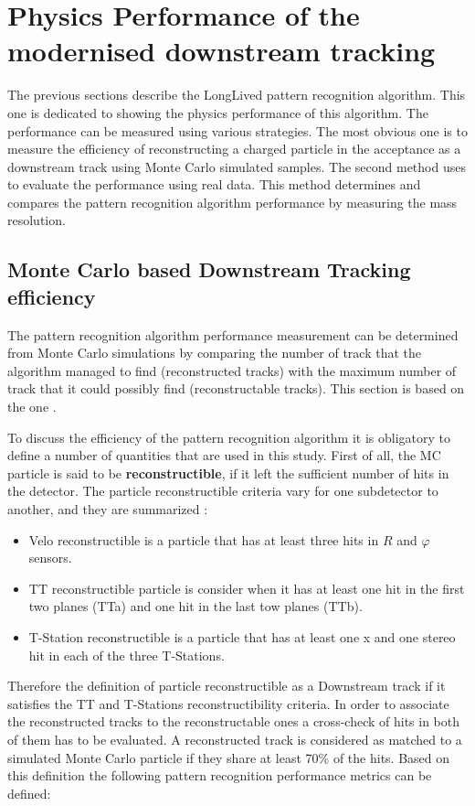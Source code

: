 \section{Physics Performance of the modernised downstream tracking}
\label{sec:physic_performance}
The previous sections describe the LongLived pattern recognition algorithm. This one is dedicated to showing the physics performance of this algorithm. The performance can be measured using various strategies. The most obvious one is to measure the efficiency of reconstructing a charged particle in the acceptance as a downstream track using Monte Carlo simulated samples.
The second method uses to evaluate the performance using real data. This method determines and compares the pattern recognition algorithm performance by measuring the mass resolution.  

\subsection{Monte Carlo based Downstream Tracking efficiency  }

The pattern recognition algorithm performance measurement can be determined from Monte Carlo simulations by comparing the number of track that the algorithm managed to find (reconstructed tracks) with the maximum number of track that it could possibly find (reconstructable tracks). This section is based on the one \cite{PATLLT}. 

To discuss the efficiency of the pattern recognition algorithm it is obligatory to define a number of quantities that are used in this study.  First of all, the MC particle is said to be \textbf{reconstructible}, if it left the sufficient number of hits in the detector. The particle reconstructible criteria vary for one subdetector to another, and they are summarized \cite{track_def}:

\begin{itemize}
    \item Velo reconstructible is a particle that has at least three hits in $R$ and $\varphi$ sensors.
    \item TT reconstructible particle is consider when it has at least one hit in the first two planes (TTa) and one hit in the last tow planes (TTb). 
    \item T-Station reconstructible is a particle that has at least one x and one stereo hit in each of the three T-Stations. 
\end{itemize}

Therefore the definition of particle reconstructible as a Downstream track if it satisfies the TT and T-Stations reconstructibility criteria. In order to associate the reconstructed tracks to the reconstructable ones a cross-check of hits in both of them has to be evaluated. A reconstructed track is considered as matched to a simulated Monte Carlo particle if they share at least 70\% of the hits.  
Based on this definition the following pattern recognition performance metrics can be defined: 

